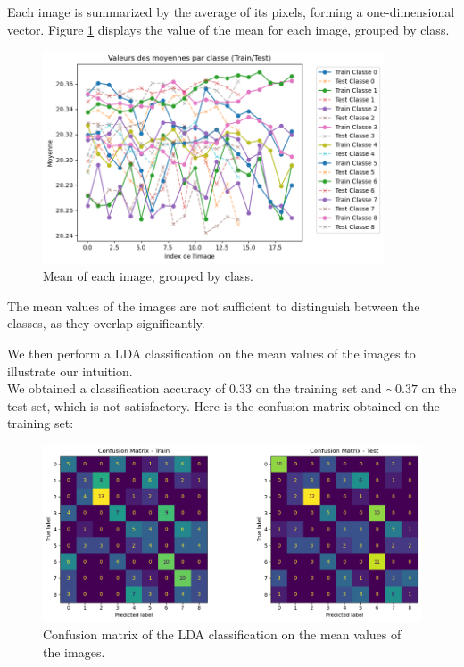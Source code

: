 \documentclass[12pt,a4paper]{article}
\begin{document}
Each image is summarized by the average of its pixels, forming a one-dimensional vector.
Figure \ref{fig:mean} displays the value of the mean for each image, grouped by class.

\begin{figure}[H]
    \centering
    \includegraphics[width=0.9\textwidth]{src/mean.png}
    \caption{Mean of each image, grouped by class.}
    \label{fig:mean}
\end{figure}

The mean values of the images are not sufficient to distinguish between the classes, as they overlap significantly.

We then perform a LDA classification on the mean values of the images to illustrate our intuition. \\

We obtained a classification accuracy of $0.33$ on the training set and $\sim 0.37$ on the test set, which is not satisfactory.
Here is the confusion matrix obtained on the training set:

\begin{figure}[H]
    \centering
    \includegraphics[width=\textwidth]{src/confusion_matrix_mean.png}
    \caption{Confusion matrix of the LDA classification on the mean values of the images.}
    \label{fig:confusion_matrix_mean}
\end{figure}
\end{document}
